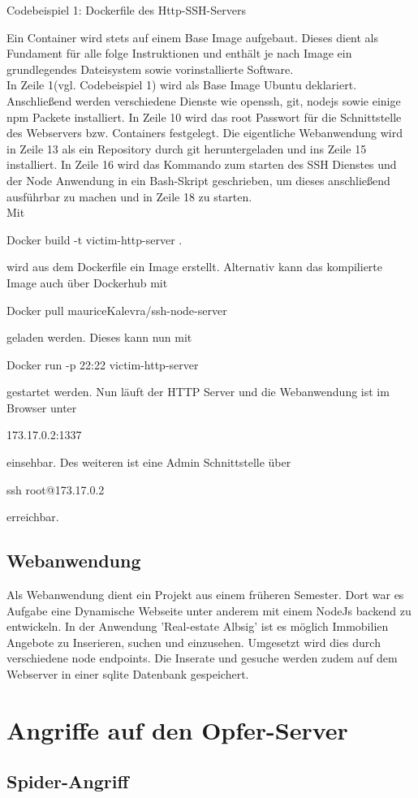 \documentclass[12pt]{article}
\begin{document}
\begin{center}
 Codebeispiel 1: Dockerfile des Http-SSH-Servers
\end{center}
Ein Container wird stets auf einem Base Image aufgebaut. Dieses dient als Fundament für alle folge Instruktionen und enthält je nach Image ein grundlegendes Dateisystem sowie vorinstallierte Software.\\
In Zeile 1(vgl. Codebeispiel 1) wird als Base Image Ubuntu deklariert. 
Anschließend werden verschiedene Dienste wie openssh, git, nodejs sowie einige npm Packete installiert.
In Zeile 10 wird das root Passwort für die Schnittstelle des Webservers bzw. Containers festgelegt. Die eigentliche Webanwendung wird in Zeile 13 als ein Repository durch git heruntergeladen und ins Zeile 15 installiert. In Zeile 16 wird das Kommando zum starten des SSH Dienstes und der Node Anwendung in ein Bash-Skript geschrieben, um dieses anschließend ausführbar zu machen und in Zeile 18 zu starten.\\
Mit \colorbox{mshadecolor}{\parbox{0.46\textwidth}{Docker build -t victim-http-server .}} wird aus dem Dockerfile ein Image erstellt. Alternativ kann das kompilierte Image auch über Dockerhub mit \colorbox{mshadecolor}{\parbox{0.58\textwidth}{Docker pull mauriceKalevra/ssh-node-server}} geladen werden. Dieses kann nun mit \colorbox{mshadecolor}{\parbox{0.51\textwidth}{Docker run -p 22:22 victim-http-server}} gestartet werden. Nun läuft der HTTP Server und die Webanwendung ist im Browser unter
\colorbox{mshadecolor}{\parbox{0.20\textwidth}{173.17.0.2:1337}} einsehbar. Des weiteren ist eine Admin Schnittstelle über \colorbox{mshadecolor}{\parbox{0.26\textwidth}{ssh root@173.17.0.2}} erreichbar.
\subsection{Webanwendung}
Als Webanwendung dient ein Projekt aus einem früheren Semester. Dort war es Aufgabe eine Dynamische Webseite unter anderem mit einem NodeJs backend zu entwickeln. In der Anwendung 'Real-estate Albsig' ist es möglich Immobilien Angebote zu Inserieren, suchen und einzusehen. Umgesetzt wird dies durch verschiedene node endpoints. Die Inserate und gesuche werden zudem auf dem Webserver in einer sqlite Datenbank gespeichert.      
\newpage
\section{Angriffe auf den Opfer-Server}
\subsection{Spider-Angriff}
\end{document}
